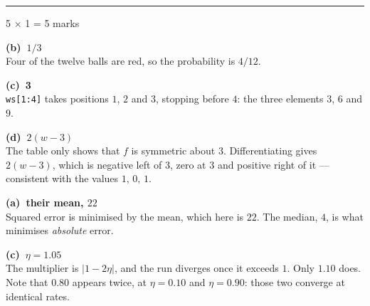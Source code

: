 \documentclass[10pt,a4paper]{article}
\newcommand{\parthead}[2]{\vspace{2pt}\noindent\rule{\linewidth}{0.4pt}\par\vspace{2pt}%
  \noindent{\bfseries Part #1}\hfill{\small #2}\par\vspace{1pt}}
\newcommand{\sol}[1]{\textbf{#1}}
\begin{document}
\noindent{}
\vspace{3pt}


\parthead{A --- Multiple choice}{5 $\times$ 1 = 5 marks}

\begin{sA}

  \item \sol{(b)\ $1/3$}\\ Four of the twelve balls are red, so the probability is $4/12$.

  \item \sol{(c)\ 3}\\ \texttt{ws[1:4]} takes positions $1$, $2$ and $3$, stopping before $4$: the three elements $3$, $6$ and $9$.

  \item \sol{(d)\ $2(w-3)$}\\ The table only shows that $f$ is symmetric about $3$. Differentiating gives $2(w-3)$, which is negative left of $3$, zero at $3$ and positive right of it --- consistent with the values $1,\,0,\,1$.

  \item \sol{(a)\ their mean, $22$}\\ Squared error is minimised by the mean, which here is $22$. The median, $4$, is what minimises \emph{absolute} error.

  \item \sol{(c)\ $\eta = 1.05$}\\ The multiplier is $\lvert 1 - 2\eta \rvert$, and the run diverges once it exceeds $1$. Only $1.10$ does. Note that $0.80$ appears twice, at $\eta = 0.10$ and $\eta = 0.90$: those two converge at identical rates.

\end{sA}

\vspace{3pt}
\end{document}
